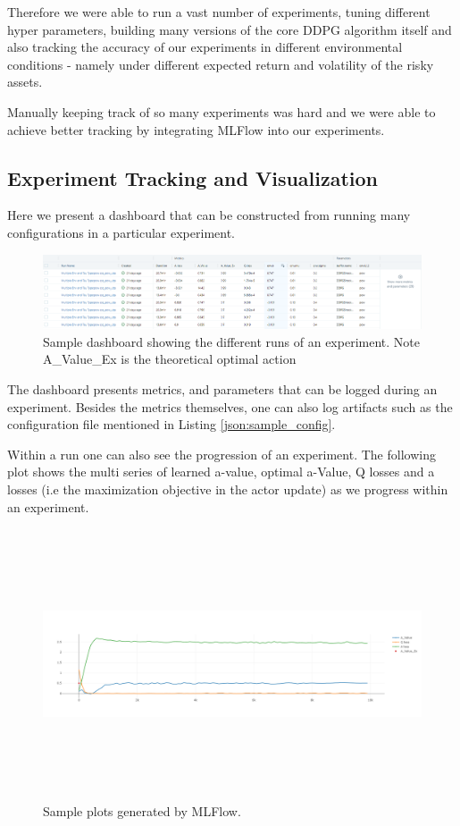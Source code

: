 Therefore we were able to run a vast number of experiments, tuning different hyper parameters, building  many versions of the core DDPG algorithm itself and also tracking the accuracy of our experiments in different environmental conditions - namely under different expected return and volatility of the risky assets.

Manually keeping track of so many experiments was hard and we were able to achieve better tracking by integrating MLFlow \cite{Zaharia2018MLflow} into our experiments. 

\subsection{Experiment Tracking and Visualization}

Here we present a dashboard that can be constructed from running many configurations in a particular experiment.

\begin{figure}[htpb]
\centering
  \includegraphics[width=1.0\textwidth]{figures/Dashboards.png}
  \caption[Sample Dashboard - Different Runs]{Sample dashboard showing the different runs of an experiment. Note A\_Value\_Ex is the theoretical optimal action } \label{fig:dashboard}
\end{figure}

The dashboard presents metrics, and parameters that can be logged during an experiment. Besides the metrics themselves, one can also log artifacts such as the configuration file mentioned in Listing \ref{json:sample_config}.

Within a run one can also see the progression of an experiment. The following plot shows the multi series of learned a-value, optimal a-Value, Q losses and a losses (i.e the maximization objective in the actor update) as we progress within an experiment.

\begin{figure}[htpb]
\centering
  \includegraphics[width=1\textwidth,height=8cm]{figures/Losses.png}
  \caption[Sample Dashboard MLFlow]{Sample plots generated by MLFlow. } \label{fig:dashboard}
\end{figure}

